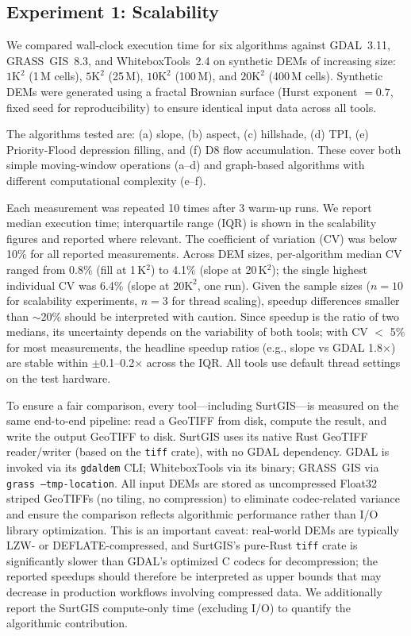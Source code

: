 \documentclass[preprint,review,12pt,authoryear]{elsarticle}
\begin{document}
\subsection{Experiment 1: Scalability}
\label{subsec:scalability}

We compared wall-clock execution time for six algorithms against GDAL~3.11, GRASS~GIS~8.3, and WhiteboxTools~2.4 on synthetic DEMs of increasing size: $1\text{K}^2$ (1\,M cells), $5\text{K}^2$ (25\,M), $10\text{K}^2$ (100\,M), and $20\text{K}^2$ (400\,M cells). Synthetic DEMs were generated using a fractal Brownian surface (Hurst exponent $= 0.7$, fixed seed for reproducibility) to ensure identical input data across all tools.

The algorithms tested are: (a) slope, (b) aspect, (c) hillshade, (d) TPI, (e) Priority-Flood depression filling, and (f) D8 flow accumulation. These cover both simple moving-window operations (a--d) and graph-based algorithms with different computational complexity (e--f).

Each measurement was repeated 10 times after 3 warm-up runs. We report median execution time; interquartile range (IQR) is shown in the scalability figures and reported where relevant. The coefficient of variation (CV) was below 10\% for all reported measurements. Across DEM sizes, per-algorithm median CV ranged from 0.8\% (fill at 1\,K$^2$) to 4.1\% (slope at 20\,K$^2$); the single highest individual CV was 6.4\% (slope at $20\text{K}^2$, one run). Given the sample sizes ($n=10$ for scalability experiments, $n=3$ for thread scaling), speedup differences smaller than $\sim$20\% should be interpreted with caution. Since speedup is the ratio of two medians, its uncertainty depends on the variability of both tools; with CV $<$ 5\% for most measurements, the headline speedup ratios (e.g., slope vs GDAL 1.8$\times$) are stable within $\pm$0.1--0.2$\times$ across the IQR. All tools use default thread settings on the test hardware.

To ensure a fair comparison, every tool---including SurtGIS---is measured on the same end-to-end pipeline: read a GeoTIFF from disk, compute the result, and write the output GeoTIFF to disk. SurtGIS uses its native Rust GeoTIFF reader/writer (based on the \texttt{tiff} crate), with no GDAL dependency. GDAL is invoked via its \texttt{gdaldem} CLI; WhiteboxTools via its binary; GRASS~GIS via \texttt{grass --tmp-location}. All input DEMs are stored as uncompressed Float32 striped GeoTIFFs (no tiling, no compression) to eliminate codec-related variance and ensure the comparison reflects algorithmic performance rather than I/O library optimization. This is an important caveat: real-world DEMs are typically LZW- or DEFLATE-compressed, and SurtGIS's pure-Rust \texttt{tiff} crate is significantly slower than GDAL's optimized C codecs for decompression; the reported speedups should therefore be interpreted as upper bounds that may decrease in production workflows involving compressed data. We additionally report the SurtGIS compute-only time (excluding I/O) to quantify the algorithmic contribution.
\end{document}
